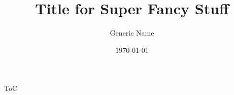 \documentclass[11pt]{beamer}
\author{Generic Name}
\title{Title for Super Fancy Stuff}
\institute[]{Some Super Fancy Institution}
\date{\today}
\begin{document}
\begin{frame}
    \titlepage
\end{frame}

\begin{frame}{ToC}
    \tableofcontents
\end{frame}






            
            
                
        
\end{document}
